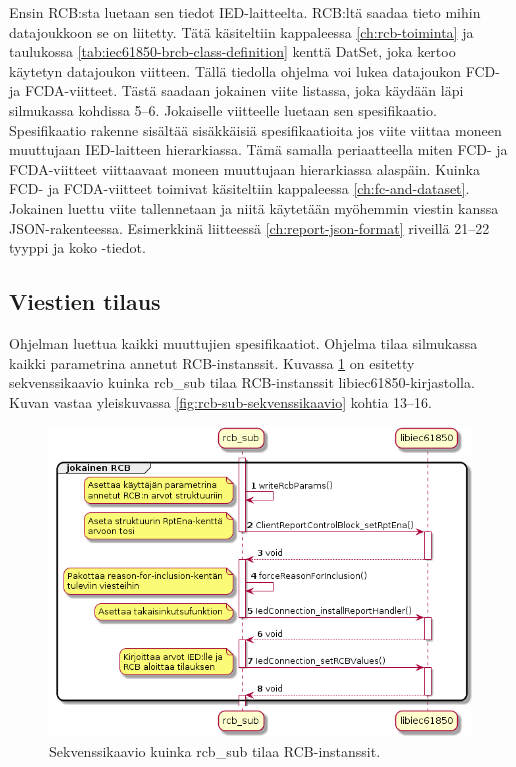 Ensin RCB:sta luetaan sen tiedot IED-laitteelta. RCB:ltä saadaa tieto mihin datajoukkoon se on liitetty. Tätä käsiteltiin kappaleessa \ref{ch:rcb-toiminta} ja taulukossa \ref{tab:iec61850-brcb-class-definition} kenttä DatSet, joka kertoo käytetyn datajoukon viitteen. Tällä tiedolla ohjelma voi lukea datajoukon FCD- ja FCDA-viitteet. Tästä saadaan jokainen viite listassa, joka käydään läpi silmukassa kohdissa 5--6. Jokaiselle viitteelle luetaan sen spesifikaatio. Spesifikaatio rakenne sisältää sisäkkäisiä spesifikaatioita jos viite viittaa moneen muuttujaan IED-laitteen hierarkiassa. Tämä samalla periaatteella miten FCD- ja FCDA-viitteet viittaavaat moneen muuttujaan hierarkiassa alaspäin. Kuinka FCD- ja FCDA-viitteet toimivat käsiteltiin kappaleessa \ref{ch:fc-and-dataset}. Jokainen luettu viite tallennetaan ja niitä käytetään myöhemmin viestin kanssa JSON-rakenteessa. Esimerkkinä liitteessä \ref{ch:report-json-format} riveillä 21--22 tyyppi ja koko -tiedot.


\subsection{Viestien tilaus}
Ohjelman luettua kaikki muuttujien spesifikaatiot. Ohjelma tilaa silmukassa kaikki parametrina annetut RCB-instanssit. Kuvassa \ref{fig:rcb-sub-subscribe-reports} on esitetty sekvenssikaavio kuinka rcb\_sub tilaa RCB-instanssit libiec61850-kirjastolla. Kuvan vastaa yleiskuvassa \ref{fig:rcb-sub-sekvenssikaavio} kohtia 13--16.

\begin{figure}[ht!]
	\includegraphics[width=1\textwidth]{pictures/rcb-sub-subscribe-reports.png}
	\caption{Sekvenssikaavio kuinka rcb\_sub tilaa RCB-instanssit.}
	\label{fig:rcb-sub-subscribe-reports}
\end{figure}

